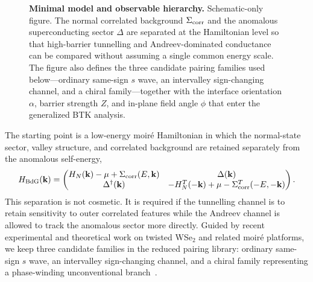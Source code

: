 \documentclass[aps,prl,twocolumn,superscriptaddress,longbibliography]{revtex4-2}
\begin{document}
\begin{figure}[t]
  \centering
  \caption{\textbf{Minimal model and observable hierarchy.}
  Schematic-only figure. The normal correlated background
  $\Sigma_{\rm corr}$ and the anomalous superconducting sector $\Delta$ are
  separated at the Hamiltonian level so that high-barrier tunnelling and
  Andreev-dominated conductance can be compared without assuming a single common
  energy scale. The figure also defines the three candidate pairing families
  used below---ordinary same-sign $s$ wave, an intervalley sign-changing
  channel, and a chiral family---together with the interface orientation
  $\alpha$, barrier strength $Z$, and in-plane field angle $\phi$ that enter the
  generalized BTK analysis.}
  \label{fig:model}
\end{figure}

The starting point is a low-energy moir\'e Hamiltonian in which the normal-state
sector, valley structure, and correlated background are retained separately from
the anomalous self-energy,
\begin{equation}
H_{\rm BdG}(\mathbf{k})=
\begin{pmatrix}
H_N(\mathbf{k})-\mu+\Sigma_{\rm corr}(E,\mathbf{k}) & \Delta(\mathbf{k}) \\
\Delta^\dagger(\mathbf{k}) &
-H_N^{T}(-\mathbf{k})+\mu-\Sigma_{\rm corr}^{T}(-E,-\mathbf{k})
\end{pmatrix}.
\end{equation}
This separation is not cosmetic. It is required if the tunnelling channel is to
retain sensitivity to outer correlated features while the Andreev channel is
allowed to track the anomalous sector more directly. Guided by recent
experimental and theoretical work on twisted WSe$_2$ and related moir\'e
platforms, we keep three candidate families in the reduced pairing library:
ordinary same-sign $s$ wave, an intervalley sign-changing channel, and a chiral
family representing a phase-winding unconventional branch~\cite{Schrade2024,TopologicalWSe22025,NuOne2025,ChiralBandsMoTe22025,ReadGreen2000,SigristUeda1991,SatoAndo2017}.
\end{document}
